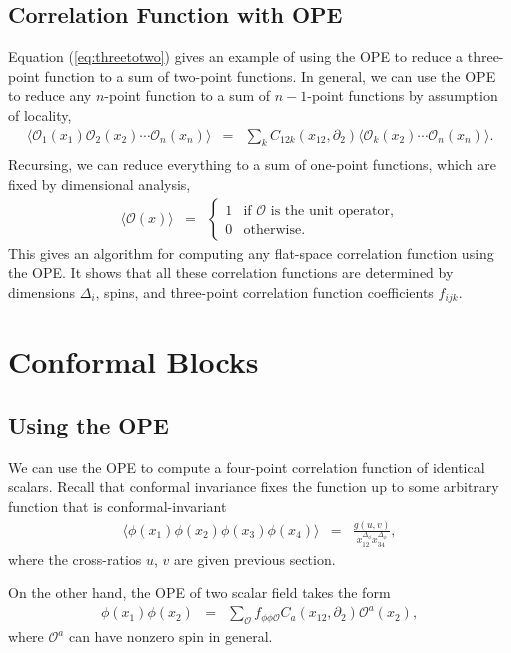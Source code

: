\documentclass[12pt]{article}
\numberwithin{equation}{section}
\newcommand\be{\begin{eqnarray}}
\newcommand\ee{\end{eqnarray}}
\newcommand\f\phi
\newcommand\cO{\mathcal{O}}
\newcommand\ptl\partial
\newcommand\<\langle
\renewcommand\>\rangle
\newcommand\R{\mathbb{R}}
\newcommand\nn{\nonumber}
\renewcommand\.{\cdot}
\newcommand\x\times
\newcommand\SO{\mathrm{SO}}
\newcommand\De{\Delta}
\renewcommand\b\beta
\begin{document}
\subsection{Correlation Function with OPE}

Equation (\ref{eq:threetotwo}) gives an example of using the OPE to reduce a three-point function to a sum of two-point functions.  In general, we can use the OPE to reduce any $n$-point function to a sum of $n-1$-point functions by assumption of locality,
\be
\<\cO_1(x_1)\cO_2(x_2)\cdots\cO_n(x_n)\> &=& \sum_k C_{12k}(x_{12},\ptl_2)\<\cO_k(x_2)\cdots\cO_n(x_n)\>.\nn\\
\ee
Recursing, we can reduce everything to a sum of one-point functions, which are fixed by dimensional analysis,
\be
\<\cO(x)\> &=& \begin{cases}
1 & \textrm{if $\cO$ is the unit operator,}\\
0 & \textrm{otherwise.}
\end{cases}
\ee
This gives an algorithm for computing any flat-space correlation function using the OPE\@.  It shows that all these correlation functions are determined by dimensions $\De_i$, spins, and three-point correlation function coefficients $f_{ijk}$.

\section{Conformal Blocks}

\subsection{Using the OPE}

We can use the OPE to compute a four-point correlation function of identical scalars. Recall that conformal invariance fixes the function up to some arbitrary function that is conformal-invariant
\be
\<\f(x_1)\f(x_2)\f(x_3)\f(x_4)\> &=& \frac{g(u, v)}{x_{12}^{\De_\f}x_{34}^{\De_\f}},
\ee
where the cross-ratios $u$, $v$ are given previous section.

On the other hand, the OPE of two scalar field takes the form
\be
\label{eq:scalarscalarOPE}
\f(x_1)\f(x_2) &=& \sum_\cO f_{\f\f\cO} C_{a}(x_{12},\ptl_2)\cO^{a}(x_2),
\ee
where $\cO^{a}$ can have nonzero spin in general. 
\end{document}
